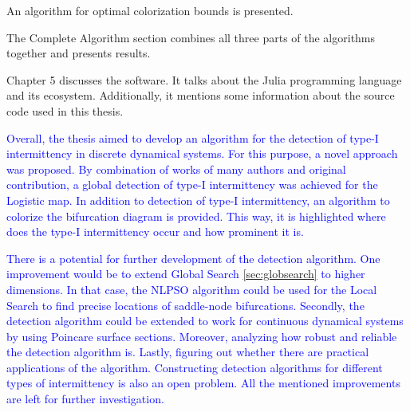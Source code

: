 An algorithm for optimal colorization bounds is presented.
\par
The Complete Algorithm section combines all three parts of the algorithms together and presents results.
\par
Chapter 5 discusses the software.
It talks about the Julia programming language and its ecosystem.
Additionally, it mentions some information about the source code used in this thesis.
\par
\textcolor{blue}{
Overall, the thesis aimed to develop an algorithm for the detection of type-I intermittency in discrete dynamical systems.
For this purpose, a novel approach was proposed.
By combination of works of many authors and original contribution, a global detection of type-I intermittency was achieved for the Logistic map.
In addition to detection of type-I intermittency, an algorithm to colorize the bifurcation diagram is provided.
This way, it is highlighted where does the type-I intermittency occur and how prominent it is.
}
\par
\textcolor{blue}{
There is a potential for further development of the detection algorithm.
One improvement would be to extend Global Search \ref{sec:globsearch} to higher dimensions.
In that case, the NLPSO algorithm could be used for the Local Search to find precise locations of saddle-node bifurcations.
Secondly, the detection algorithm could be extended to work for continuous dynamical systems by using Poincare surface sections.
Moreover, analyzing how robust and reliable the detection algorithm is.
Lastly, figuring out whether there are practical applications of the algorithm.
Constructing detection algorithms for different types of intermittency is also an open problem.
All the mentioned improvements are left for further investigation.
}

\endinput